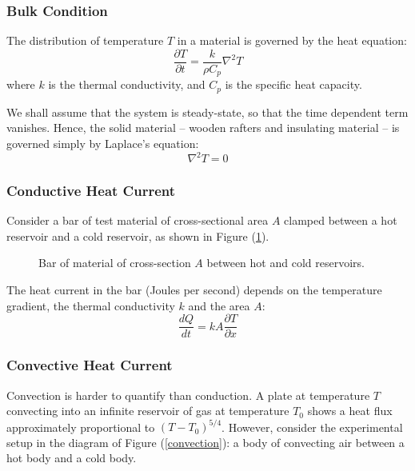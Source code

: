 \documentclass[12pt, a4paper, twoside, openright]{book}
\begin{document}
\subsubsection{Bulk Condition}

The distribution of temperature $T$ in a material is governed by the heat equation:
\begin{equation}
\frac{\partial T}{\partial t} = \frac{k}{\rho C_p} \nabla^2 T
\end{equation}
where $k$ is the thermal conductivity, and $C_p$ is the specific heat capacity.

We shall assume that the system is steady-state, so that the time dependent term vanishes.  Hence, the solid material -- wooden rafters and insulating material -- is governed simply by Laplace's equation:
\begin{equation}
\nabla^2 T = 0
\end{equation}

\subsubsection{Conductive Heat Current}
Consider a bar of test material of cross-sectional area $A$ clamped between a hot reservoir and a cold reservoir, as shown in Figure (\ref{conduction}).

\begin{figure}[ht]
\centering
{}
\caption{Bar of material of cross-section $A$ between hot and cold reservoirs.}\label{conduction}
\end{figure}

The heat current in the bar (Joules per second) depends on the temperature gradient, the thermal conductivity $k$ and the area $A$:
\begin{equation}
\frac{dQ}{dt} = k A \frac{\partial T}{\partial x}
\end{equation}


\subsubsection{Convective Heat Current}
Convection is harder to quantify than conduction.   
A plate at temperature $T$ convecting into an infinite reservoir of gas at temperature $T_0$ shows a heat flux approximately proportional to $(T - T_0)^{5/4}$.
However, consider the experimental setup in the diagram of Figure (\ref{convection}): a body of convecting air between a hot body and a cold body.
\end{document}
